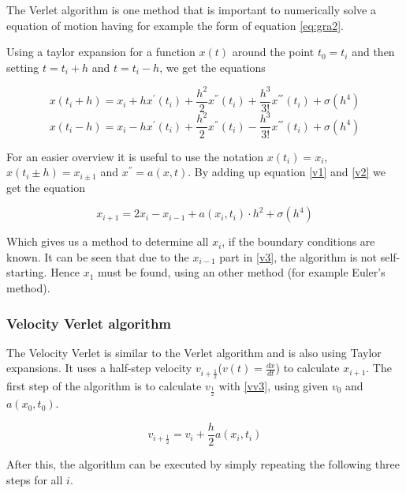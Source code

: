 \documentclass[10pt,a4paper]{article}
\begin{document}
The Verlet algorithm is one method that is important to numerically solve a equation of motion having for example the form of equation \eqref{eq:gra2}. 

Using a taylor expansion for a function $x(t)$ around the point $t_0 = t_i$ and then setting $t = t_i + h$ and $t = t_i - h$, we get the equations

\begin{equation}
\label{v1}
x(t_i + h) = x_i + h  x^{'}(t_i) + \frac{h^2}{2}  x^{''}(t_i) + \frac{h^3}{3!}  x^{'''}(t_i) + \sigma (h^4)
\end{equation}
\begin{equation}
\label{v2}
x(t_i - h) = x_i - h  x^{'}(t_i) + \frac{h^2}{2}  x^{''}(t_i) - \frac{h^3}{3!}  x^{'''}(t_i) + \sigma (h^4)
\end{equation}

For an easier overview it is useful to use the notation $x(t_i) = x_i$, $x(t_i \pm h) = x_{i \pm 1}$ and $x^{''} = a(x, t)$. By adding up equation \eqref{v1} and \eqref{v2} we get the equation

\begin{equation}
\label{v3}
	x_{i+1} = 2 x_i - x_{i-1} + a(x_i, t_i) \cdot h^2 + \sigma(h^4)
\end{equation}

Which gives us a method to determine all $x_i$, if the boundary conditions are known. It can be seen that due to the $x_{i-1}$ part in \eqref{v3}, the algorithm is not self-starting. Hence $x_1$ must be found, using an other method (for example Euler's method).

\subsubsection{Velocity Verlet algorithm}

The Velocity Verlet is similar to the Verlet algorithm and is also using Taylor expansions. It uses a half-step velocity $v_{i+\frac{1}{2}}$($v(t) = \frac{dx}{dt}$) to calculate $x_{i+1}$. The first step of the algorithm is to calculate $v_{\frac{1}{2}}$ with \eqref{vv3}, using given $v_0$ and $a(x_0, t_0)$.

\begin{equation}
	\label{vv3}
	v_{i + \frac{1}{2}} = v_i + \frac{h}{2} a(x_i, t_i)
\end{equation}

After this, the algorithm can be executed by simply repeating the following three steps for all $i$.
\end{document}

